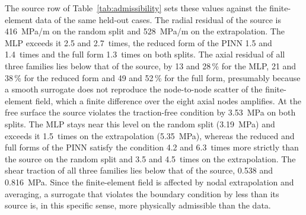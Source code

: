 The source row of Table~\ref{tab:admissibility} sets these values against the finite-element data of the same held-out cases. The radial residual of the source is 416~MPa/m on the random split and 528~MPa/m on the extrapolation. The MLP exceeds it 2.5 and 2.7~times, the reduced form of the PINN 1.5 and 1.4~times and the full form 1.3~times on both splits. The axial residual of all three families lies below that of the source, by 13 and 28\,\% for the MLP, 21 and 38\,\% for the reduced form and 49 and 52\,\% for the full form, presumably because a smooth surrogate does not reproduce the node-to-node scatter of the finite-element field, which a finite difference over the eight axial nodes amplifies. At the free surface the source violates the traction-free condition by 3.53~MPa on both splits. The MLP stays near this level on the random split (3.19~MPa) and exceeds it 1.5~times on the extrapolation (5.35~MPa), whereas the reduced and full forms of the PINN satisfy the condition 4.2 and 6.3~times more strictly than the source on the random split and 3.5 and 4.5~times on the extrapolation. The shear traction of all three families lies below that of the source, 0.538 and 0.816~MPa. Since the finite-element field is affected by nodal extrapolation and averaging, a surrogate that violates the boundary condition by less than its source is, in this specific sense, more physically admissible than the data.

